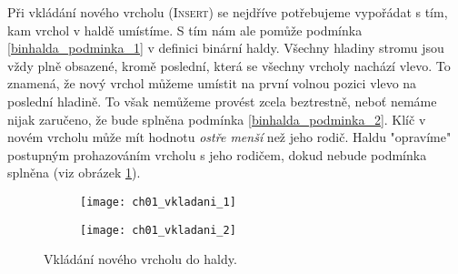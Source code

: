 Při vkládání nového vrcholu (\textsc{Insert}) se nejdříve potřebujeme vypořádat s tím, kam vrchol v haldě umístíme. S tím nám ale pomůže podmínka \ref{binhalda_podminka_1} v definici binární haldy. Všechny hladiny stromu jsou vždy plně obsazené, kromě poslední, která se všechny vrcholy nachází vlevo. To znamená, že nový vrchol můžeme umístit na první volnou pozici vlevo na poslední hladině. To však nemůžeme provést zcela beztrestně, neboť nemáme nijak zaručeno, že bude splněna podmínka \ref{binhalda_podminka_2}. Klíč v novém vrcholu může mít hodnotu \emph{ostře menší} než jeho rodič. Haldu "opravíme" postupným prohazováním vrcholu s jeho rodičem, dokud nebude podmínka splněna (viz obrázek \ref{fig:vkladani_vrcholu_halda}).
\begin{figure}[h]
    \centering
    \begin{subfigure}{7cm}
        \texttt{[image: ch01\_vkladani\_1]}
    \end{subfigure}
    \begin{subfigure}{7cm}
        \texttt{[image: ch01\_vkladani\_2]}
    \end{subfigure}
    \caption{Vkládání nového vrcholu do haldy.}
    \label{fig:vkladani_vrcholu_halda}
\end{figure}
